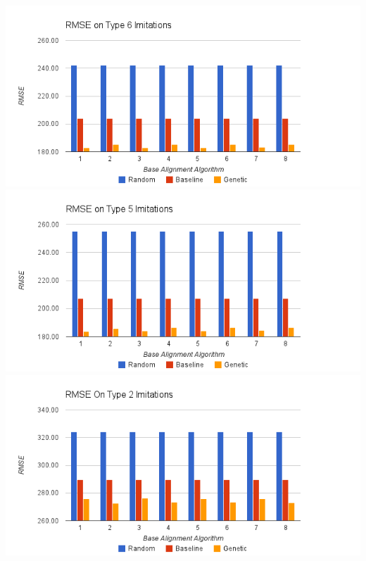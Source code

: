 \includegraphics[width=16cm]{images/chart6.png}
\includegraphics[width=16cm]{images/chart7.png}
\includegraphics[width=16cm]{images/chart8.png}


